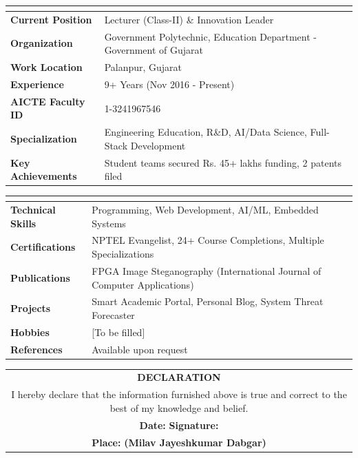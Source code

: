 \documentclass[11pt,a4paper]{article}
\begin{document}
\begin{tabularx}{\textwidth}{|>{\bfseries}p{4cm}|X|}
\hline
\rowcolor{lightgray}
\multicolumn{2}{|c|}{\large\bfseries PROFESSIONAL INFORMATION} \\
\hline
Current Position & Lecturer (Class-II) \& Innovation Leader \\
\hline
Organization & Government Polytechnic, Education Department - Government of Gujarat \\
\hline
Work Location & Palanpur, Gujarat \\
\hline
Experience & 9+ Years (Nov 2016 - Present) \\
\hline
AICTE Faculty ID & 1-3241967546 \\
\hline
Specialization & Engineering Education, R\&D, AI/Data Science, Full-Stack Development \\
\hline
Key Achievements & Student teams secured Rs. 45+ lakhs funding, 2 patents filed \\
\hline
\end{tabularx}

\vspace{10pt}

\begin{tabularx}{\textwidth}{|>{\bfseries}p{4cm}|X|}
\hline
\rowcolor{lightgray}
\multicolumn{2}{|c|}{\large\bfseries ADDITIONAL INFORMATION} \\
\hline
Technical Skills & Programming, Web Development, AI/ML, Embedded Systems \\
\hline
Certifications & NPTEL Evangelist, 24+ Course Completions, Multiple Specializations \\
\hline
Publications & FPGA Image Steganography (International Journal of Computer Applications) \\
\hline
Projects & Smart Academic Portal, Personal Blog, System Threat Forecaster \\
\hline
Hobbies & [To be filled] \\
\hline
References & Available upon request \\
\hline
\end{tabularx}

\vspace{20pt}

\begin{center}
\begin{tabular}{c}
\textbf{DECLARATION} \\[10pt]
\begin{minipage}{0.8\textwidth}
\centering
I hereby declare that the information furnished above is true and correct to the best of my knowledge and belief.
\end{minipage} \\[20pt]
\textbf{Date:} \underline{\hspace{3cm}} \hfill \textbf{Signature:} \underline{\hspace{4cm}} \\[10pt]
\textbf{Place:} \underline{\hspace{3cm}} \hfill \textbf{(Milav Jayeshkumar Dabgar)}
\end{tabular}
\end{center}
\end{document}
